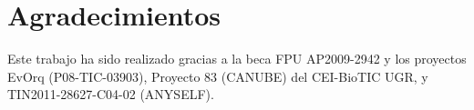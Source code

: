 \documentclass[runningheads]{llncs}
\begin{document}
\section{Agradecimientos}
Este trabajo ha sido realizado gracias a la beca FPU AP2009-2942 y los proyectos EvOrq (P08-TIC-03903), Proyecto 83 (CANUBE) del CEI-BioTIC UGR, y TIN2011-28627-C04-02 (ANYSELF).






\end{document}
